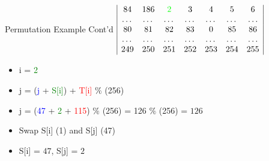 \documentclass[
	aspectratio=169,	%
	onlytextwidth,		%
	t,					%
	]{beamer}
\begin{document}
\begin{frame}{Permutation Example Cont'd}
	$\begin{array}{|ccccccc|}
		84 & 186 & \textcolor{green}{2} & 3 & 4 & 5 & 6 \\
		\dots & \dots & \dots & \dots & \dots & \dots & \dots \\
		80 & 81 & 82 & 83 & 0 & 85 & 86 \\
		\dots & \dots & \dots & \dots & \dots & \dots & \dots \\
		249 & 250 & 251 & 252 & 253 & 254 & 255 \\
	\end{array}$
	\begin{itemize}
		\item i = \textcolor{green}{2}
		\item j = (\textcolor{blue} {j} + \textcolor{green}{S[i]}) + \textcolor{red}{T[i]} $\%$ (256)
		\item j = (\textcolor{blue} {47} + \textcolor{green} {2} + \textcolor{red} {115}) $\%$ (256) = 126 $\%$ (256) = $126$
		\item Swap S[i] (1) and S[j] (47)
		\item S[i] = $47$, S[j] = $2$
	\end{itemize}
\end{frame}
\end{document}
